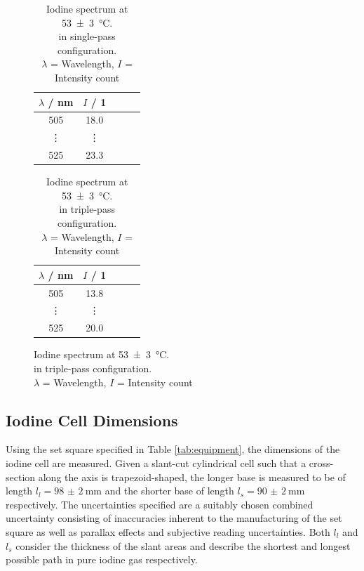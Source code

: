 \begin{figure}[H]
    \centering
    \begin{minipage}[b]{0.48\textwidth}
        \centering
        \begin{table}[H]
            \centering
            \caption{Iodine spectrum at \SI{53(3)}{\celsius}. \\in single-pass configuration. \\
            $\lambda$ = Wavelength, $I$ = Intensity count}
            \label{tab:execution:iodine:single:3}
            \begin{tabular}{ccccc}
            \hline
            $\lambda$ / nm & $I$ / 1 \\ \hline
            505  & 18.0  \\
            \vdots & \vdots  \\
            525 & 23.3 \\ \hline
            \end{tabular}
        \end{table}
    \end{minipage}
    \hfill
     \begin{minipage}[b]{0.48\textwidth}
        \centering
        \begin{table}[H]
            \centering
            \caption{Iodine spectrum at \SI{53(3)}{\celsius}. \\in triple-pass configuration. \\
            $\lambda$ = Wavelength, $I$ = Intensity count}
            \label{tab:execution:iodine:triple}
            \begin{tabular}{ccccc}
            \hline
            $\lambda$ / nm & $I$ / 1 \\ \hline
            505  & 13.8  \\
            \vdots & \vdots  \\
            525 & 20.0 \\ \hline
            \end{tabular}
        \end{table}
    \end{minipage}
\end{figure}

\subsection{Iodine Cell Dimensions}
\label{sec:execution:iodine-cell-dimensions}

Using the set square specified in Table \ref{tab:equipment}, the dimensions of the iodine cell are measured. Given a slant-cut cylindrical cell such that a cross-section along the axis is trapezoid-shaped, the longer base is measured to be of length $l_l = \SI{98(2)}{\mm}$ and the shorter base of length $l_s = \SI{90(2)}{\mm}$ respectively. The uncertainties specified are a suitably chosen combined uncertainty consisting of inaccuracies inherent to the manufacturing of the set square as well as parallax effects and subjective reading uncertainties. Both $l_l$ and $l_s$ consider the thickness of the slant areas and describe the shortest and longest possible path in pure iodine gas respectively.

\newpage